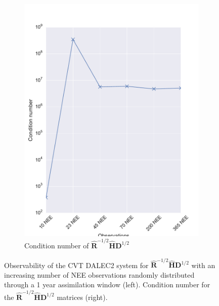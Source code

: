 \documentclass[11pt]{article}
\begin{document}
\begin{figure}[ht]
\begin{subfigure}[b]{0.49\textwidth}
        \includegraphics[width=\textwidth]{dalec2_obsrankcondcvtwind.pdf}
        \caption{Condition number of $\hat{\textbf{R}}^{-1/2}\hat{\textbf{H}}\textbf{D}^{1/2}$}
        \label{fig:D2_observabilitycondcvtwind}
    \end{subfigure}
    \caption{Observability of the CVT DALEC2 system for $\hat{\textbf{R}}^{-1/2}\hat{\textbf{H}}\textbf{D}^{1/2}$ with an increasing number of NEE observations randomly distributed through a 1 year assimilation window (left). Condition number for the $\hat{\textbf{R}}^{-1/2}\hat{\textbf{H}}\textbf{D}^{1/2}$ matrices (right).}
    \label{fig:D2_cvtobservabilitywind}
\end{figure}


{}
\end{document}
